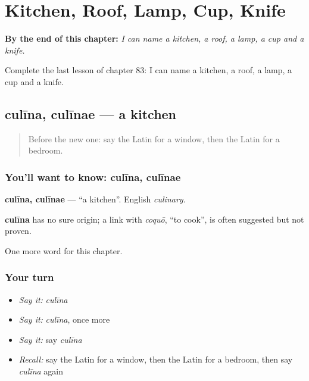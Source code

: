 
\chapter{Kitchen, Roof, Lamp, Cup, Knife}
\label{ch:la-kitchen-roof-lamp-cup-knife}

\begin{chapteropening}
\textbf{By the end of this chapter:} \emph{I can name a kitchen, a roof, a lamp, a cup and a knife.}

Complete the last lesson of chapter 83: I can name a kitchen, a roof, a lamp, a cup and a knife.
\end{chapteropening}

\section[culīna, culīnae]{culīna, culīnae — a kitchen}

\label{lesson:LA-C83-culina}



\begin{quote}
Before the new one: say the Latin for a window, then the Latin for a bedroom.
\end{quote}

\subsection*{You'll want to know: culīna, culīnae}
\textbf{culīna, culīnae} — \textquotedblleft{}a kitchen\textquotedblright{}. English \emph{culinary}.

\begin{cousinweb}
\textbf{culīna} has no sure origin; a link with \emph{coquō}, \textquotedblleft{}to cook\textquotedblright{}, is often suggested but not proven.
\end{cousinweb}

\begin{grammarlens}[title={What you've built}]
One more word for this chapter.
\end{grammarlens}

\subsection*{Your turn}
\begin{itemize}
\raggedright
  \item \emph{Say it:} \emph{culīna}
  \item \emph{Say it:} \emph{culīna}, once more
  \item \emph{Say it:} say \emph{culīna}
  \item \emph{Recall:} say the Latin for a window, then the Latin for a bedroom, then say \emph{culīna} again
\end{itemize}

